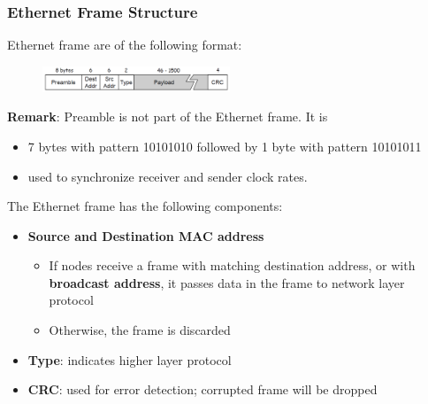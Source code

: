 \documentclass[12pt]{article}
\theoremstyle{definition}
\begin{document}
\subsubsection{Ethernet Frame Structure}
Ethernet frame are of the following format:
\begin{figure}[h]
\centering
\includegraphics[width = 0.5\textwidth]{9_1_1.png}
\end{figure}
\clearpage
\textbf{Remark}: Preamble is not part of the Ethernet frame. It is
\begin{itemize}
  \item 7 bytes with pattern 10101010 followed by 1 byte with pattern 10101011
  \item used to synchronize receiver and sender clock rates.
\end{itemize}
The Ethernet frame has the following components:
\begin{itemize}
  \item \textbf{Source and Destination MAC address}
  \begin{itemize}
    \item If nodes receive a frame with matching destination address, or with \textbf{broadcast address}, it passes data in the frame to network layer protocol
    \item Otherwise, the frame is discarded
  \end{itemize}
  \item \textbf{Type}: indicates higher layer protocol
  \item \textbf{CRC}: used for error detection; corrupted frame will be dropped
\end{itemize}
\end{document}
